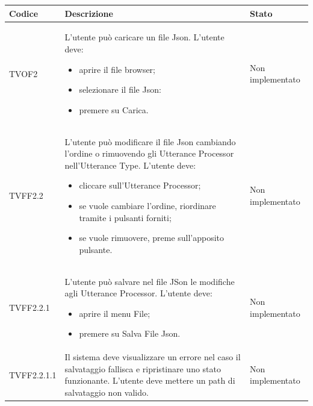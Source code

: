 \documentclass[openany,12pt,a4paper]{report}
\begin{document}
\begin{longtable}{| p{3cm} |p{8cm} | p{2.5cm} |}
	\hline
	\textbf{Codice} & \textbf{Descrizione} & \textbf{Stato}\\
	\hline
	\endhead
	
	\newline TVOF2&
	\newline L'utente può caricare un file Json. L'utente deve:
	\begin{itemize}
		\item aprire il file browser;
		\item selezionare il file Json:
		\item premere su Carica.
	\end{itemize}&
	\newline Non implementato
	\\[1em]	
	\hline	
	
	\newline TVFF2.2&
	\newline L'utente può modificare il file Json cambiando l'ordine o rimuovendo gli Utterance Processor nell'Utterance Type. L'utente deve:
	\begin{itemize}
		\item cliccare sull'Utterance Processor;
		\item se vuole cambiare l'ordine, riordinare tramite i pulsanti forniti;
		\item se vuole rimuovere, preme sull'apposito pulsante. 
	\end{itemize}&
	\newline Non implementato
	\\[1em]	
	\hline
	
	\newline TVFF2.2.1&
	\newline L'utente può salvare nel file JSon le modifiche agli Utterance Processor. L'utente deve:
	\begin{itemize}
		\item aprire il menu File;
		\item premere su Salva File Json.
	\end{itemize}&
	\newline Non implementato
	\\[1em]	
	\hline
	
	\newline TVFF2.2.1.1&
	\newline Il sistema deve visualizzare un errore nel caso il salvataggio fallisca e ripristinare uno stato funzionante. L'utente deve mettere un path di salvataggio non valido.&
	\newline Non implementato
	\\[1em]	
	\hline
	

\end{longtable}
\end{document}

